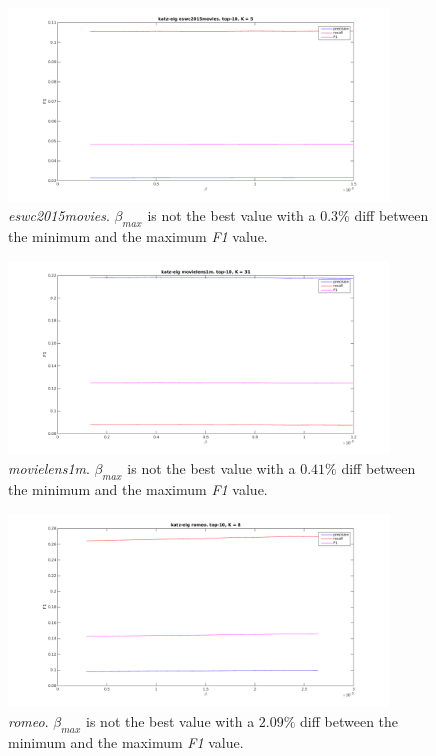\begin{figure}[h!]
  \centering
    \includegraphics[width=0.9\textwidth]{fig/katzeig_beta/eswc2015movies_katzeig_beta.png}
    \vspace{-20pt}
    \caption{\textit{eswc2015movies}.
        $\beta_{max}$ is not the best value with a $0.3\%$ diff between the minimum and the maximum \textit{F1} value.}
    \vspace{-10pt}
\end{figure}

\begin{figure}[h!]
  \centering
    \includegraphics[width=0.9\textwidth]{fig/katzeig_beta/movielens_katzeig_beta.png}
    \vspace{-20pt}
    \caption{\textit{movielens1m}.
        $\beta_{max}$ is not the best value with a $0.41\%$ diff between the minimum and the maximum \textit{F1} value.}
    \vspace{-10pt}
\end{figure}

\begin{figure}[h!]
  \centering
    \includegraphics[width=0.9\textwidth]{fig/katzeig_beta/romeo_katzeig_beta.png}
    \vspace{-20pt}
    \caption{\textit{romeo}.
        $\beta_{max}$ is not the best value with a $2.09\%$ diff between the minimum and the maximum \textit{F1} value.}
    \vspace{-10pt}
\end{figure}

